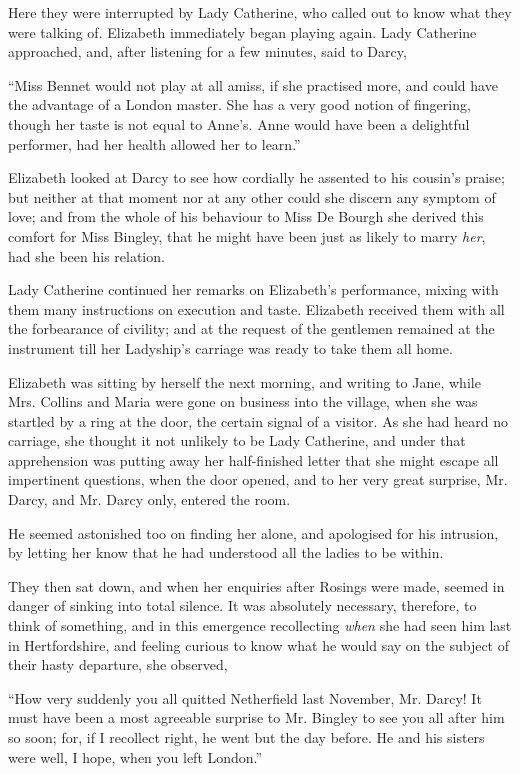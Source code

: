Here they were interrupted by Lady Catherine, who
called out to know what they were talking of. Elizabeth
immediately began playing again. Lady Catherine
approached, and, after listening for a few minutes, said
to Darcy,

“Miss Bennet would not play at all amiss, if she practised
more, and could have the advantage of a London
master. She has a very good notion of fingering, though
her taste is not equal to Anne’s. Anne would have been
a delightful performer, had her health allowed her to
learn.”

Elizabeth looked at Darcy to see how cordially he
assented to his cousin’s praise; but neither at that
moment nor at any other could she discern any symptom
of love; and from the whole of his behaviour to Miss
De Bourgh she derived this comfort for Miss Bingley,
that he might have been just as likely to marry \textit{her}, had
she been his relation.

Lady Catherine continued her remarks on Elizabeth’s
performance, mixing with them many instructions on
execution and taste. Elizabeth received them with all
the forbearance of civility; and at the request of the
gentlemen remained at the instrument till her Ladyship’s
carriage was ready to take them all home.


Elizabeth was sitting by herself the next morning, and
writing to Jane, while Mrs. Collins and Maria were gone
on business into the village, when she was startled by a ring
at the door, the certain signal of a visitor. As she had
heard no carriage, she thought it not unlikely to be
Lady Catherine, and under that apprehension was putting
away her half-finished letter that she might escape all
impertinent questions, when the door opened, and to her
very great surprise, Mr. Darcy, and Mr. Darcy only,
entered the room.

He seemed astonished too on finding her alone, and
apologised for his intrusion, by letting her know that he
had understood all the ladies to be within.

They then sat down, and when her enquiries after
Rosings were made, seemed in danger of sinking into
total silence. It was absolutely necessary, therefore, to
think of something, and in this emergence recollecting
\textit{when} she had seen him last in Hertfordshire, and feeling
curious to know what he would say on the subject of their
hasty departure, she observed,

“How very suddenly you all quitted Netherfield last
Nov\-ember, Mr. Darcy! It must have been a most agreeable
surprise to Mr. Bingley to see you all after him so
soon; for, if I recollect right, he went but the day
before. He and his sisters were well, I hope, when you
left London.”

